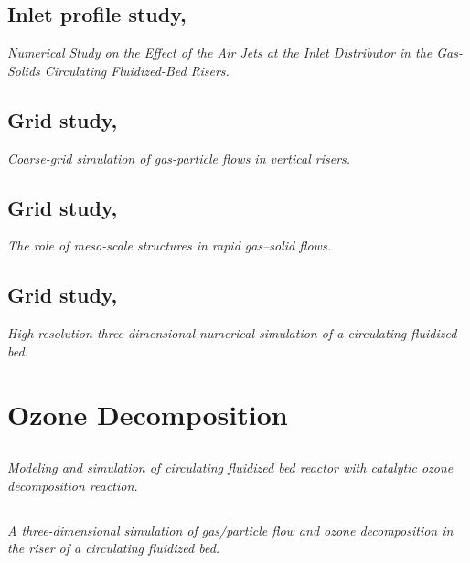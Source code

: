 \documentclass[11pt]{report}
\begin{document}
\subsection[Inlet profile study, 2010]{Inlet profile study, \cite{Peng2010}}
\textit{Numerical Study on the Effect of the Air Jets at the Inlet Distributor in the Gas-Solids Circulating Fluidized-Bed Risers.}

%
%
\subsection[Grid study, 2005]{Grid study, \cite{AndrewsIV2005}}
\textit{Coarse-grid simulation of gas-particle flows in vertical risers.}

%
%
\subsection[Grid study, 2001]{Grid study, \cite{Agrawal2001}}
\textit{The role of meso-scale structures in rapid gas–solid flows.}

%
%
\subsection[Grid study, 2001]{Grid study, \cite{Zhang2001}}
\textit{High-resolution three-dimensional numerical simulation of a circulating fluidized bed.}



\section{Ozone Decomposition}
%
%
\subsection[2003]{\cite{Therdthianwong2003}}
\textit{Modeling and simulation of circulating fluidized bed reactor with catalytic ozone decomposition reaction.}

%
%
\subsection[2004]{\cite{Hansen2004}}
\textit{A three-dimensional simulation of gas/particle flow and ozone decomposition in the riser of a circulating fluidized bed.}
\end{document}
